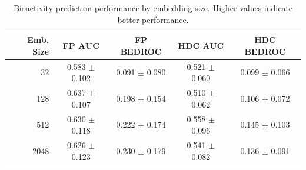 
\begin{table}[htbp]
\centering
\caption{Bioactivity prediction performance by embedding size. Higher values indicate better performance.}
\label{tab:bioactivity_emb_size}
\begin{tabular}{rcccc}
\toprule
\textbf{Emb. Size} & \textbf{FP AUC} & \textbf{FP BEDROC} & \textbf{HDC AUC} & \textbf{HDC BEDROC} \\
\midrule
32 & 0.583 $\pm$ 0.102 & 0.091 $\pm$ 0.080 & 0.521 $\pm$ 0.060 & 0.099 $\pm$ 0.066 \\
128 & 0.637 $\pm$ 0.107 & 0.198 $\pm$ 0.154 & 0.510 $\pm$ 0.062 & 0.106 $\pm$ 0.072 \\
512 & 0.630 $\pm$ 0.118 & 0.222 $\pm$ 0.174 & 0.558 $\pm$ 0.096 & 0.145 $\pm$ 0.103 \\
2048 & 0.626 $\pm$ 0.123 & 0.230 $\pm$ 0.179 & 0.541 $\pm$ 0.082 & 0.136 $\pm$ 0.091 \\
\bottomrule
\end{tabular}
\end{table}

